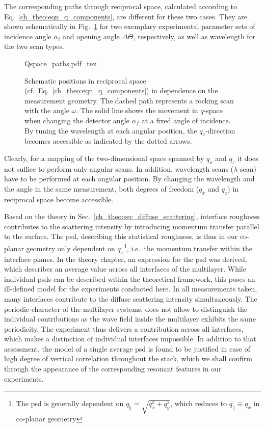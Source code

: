 The corresponding paths through reciprocal space, calculated according to Eq.~\eqref{ch_theo:eqn_q_components}, are different for these two cases. They are shown schematically in Fig.~\ref{ch_diff:fig_pathsInQ} for two exemplary experimental parameter sets of incidence angle $\alpha_i$ and opening angle $\Delta \Theta$, respectively,  as well as wavelength for the two scan types.
\begin{figure}[htbp]
    \def\svgwidth{0.7\textwidth}
    {Qspace_paths.pdf_tex}
    \caption{Schematic positions in reciprocal space (cf.~Eq.~\eqref{ch_theo:eqn_q_components}) in dependence on the measurement geometry. The dashed path represents a rocking scan with the angle $\omega$. The solid line shows the movement in $q$-space when changing the detector angle $\alpha_f$ at a fixed angle of incidence. By tuning the wavelength at each angular position, the $q_z$-direction becomes accessible as indicated by the dotted arrows.}
    \label{ch_diff:fig_pathsInQ} 
\end{figure}
Clearly, for a mapping of the two-dimensional space spanned by $q_x$ and $q_z$ it does not suffice to perform only angular scans. In addition, wavelength scans ($\lambda$-scan) have to be performed at each angular position. By changing the wavelength and the angle in the same measurement, both degrees of freedom ($q_x$ and $q_z$) in reciprocal space become accessible.

Based on the theory in Sec.~\ref{ch_theo:sec_diffuse_scattering}, interface roughness contributes to the scattering intensity by introducing momentum transfer parallel to the surface. The \gls{psd}, describing this statistical roughness, is thus in our co-planar geometry only dependent on $q_x$\footnote{The \gls{psd} is generally dependent on $q_\parallel = \sqrt{q_x^2+q_y^2}$, which reduces to $q_\parallel \equiv q_x$ in co-planar geometry}, i.e.~the momentum transfer within the interface planes. In the theory chapter, an expression for the \gls{psd} was derived, which describes an average value across all interfaces of the multilayer. While individual \gls{psd}s can be described within the theoretical framework, this poses an ill-defined model for the experiments conducted here. In all measurements taken, many interfaces contribute to the diffuse scattering intensity simultaneously. The periodic character of the multilayer systems, does not allow to distinguish the individual contributions as the wave field inside the multilayer exhibits the same periodicity. The experiment thus delivers a contribution across all interfaces, which makes a distinction of individual interfaces impossible. In addition to that assessment, the model of a single average \gls{psd} is found to be justified in case of high degree of vertical correlation throughout the stack, which we shall confirm through the appearance of the corresponding resonant features in our experiments.

